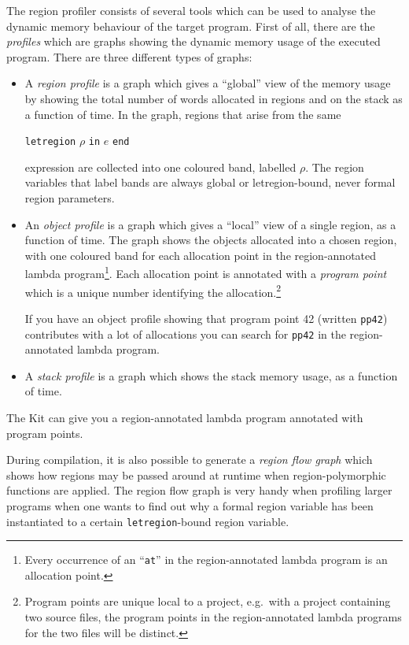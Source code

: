 \documentclass[12pt]{book}
\begin{document}
The region profiler consists of several tools which can be used to analyse
the dynamic memory behaviour of the target program. First of all, there are
the \emph{profiles} which are graphs showing the dynamic
memory usage of the executed program. There are three different types of graphs:
\begin{itemize}
\item A \emph{region profile} is a graph which gives
  a ``global'' view of the memory usage by showing the total number of
  words allocated in regions and on the stack as a function of time. In the
  graph, regions that arise from the same
\begin{center}
\texttt{letregion} $\rho$ \texttt{in} $e$ \texttt{end}
\end{center}
expression are collected into one coloured band, labelled $\rho$. The
region variables that label bands are always global or letregion-bound,
never formal region parameters.

\item An \emph{object profile} is a graph which gives
  a ``local'' view of a single region, as a function of time. The
  graph shows the objects allocated into a chosen region, with one coloured
  band for each allocation point in the region-annotated lambda
  program\footnote{Every occurrence of an ``\texttt{at}'' in the
    region-annotated lambda program is an allocation point.}.  Each
  allocation point is annotated with a \emph{program point} which is a unique number identifying the
  allocation.\footnote{Program points are unique local to a project, e.g.\ 
    with a project containing two source files, 
    the program points in the region-annotated lambda
    programs for the two files will be distinct.}

  
  If you have an object profile showing that program point 42
  (written \texttt{pp42}) contributes with a lot of allocations you
  can search for \texttt{pp42} in the region-annotated lambda
  program.
\item A \emph{stack profile} is a graph
  which shows the stack memory usage, as a function of time.
\end{itemize}

The Kit can give you a region-annotated
lambda program annotated with program points.
  
During compilation, it is also possible to generate a \emph{region flow
  graph}
%
which shows how regions may be passed around at runtime when
region-polymorphic functions are applied. The region flow graph is
very handy when profiling larger programs when one wants to find out
why a formal region variable has been instantiated to a certain
\texttt{letregion}-bound region variable.
\end{document}
